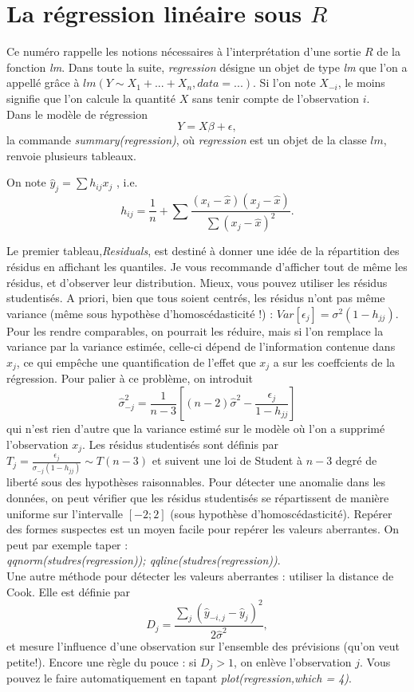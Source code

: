 \section{La régression linéaire sous $R$}

Ce numéro rappelle les notions nécessaires à l'interprétation d'une sortie $R$ de la fonction \textit{lm}. Dans toute la suite, \textit{regression} désigne un objet de type \textit{lm} que l'on a appellé grâce à $lm(Y\sim X_1+...+X_n, data=...)$. Si l'on note $X_{-i}$, le moins signifie que l'on calcule la quantité $X$ sans tenir compte de l'observation $i$.\\

Dans le modèle de régression \[Y=X\beta + \epsilon ,\]
la commande \textit{summary(regression)}, où \textit{regression} est un objet de la classe $lm$, renvoie plusieurs tableaux. 

On note $\hat y_j =  \sum h_{ij}x_j$ , i.e. \[h_{ij}= \frac{1}{n}+\sum \frac{(x_i-\hat x)(x_j-\hat x)}{\sum (x_j-\hat x)^2}.\]

Le premier tableau,\textit{Residuals}, est destiné à donner une idée de la répartition des résidus en affichant les quantiles.  Je vous recommande d'afficher tout de même les résidus, et d'observer leur distribution. Mieux, vous pouvez utiliser les résidus studentisés. A priori, bien que tous soient centrés, les résidus n'ont pas même variance (même sous hypothèse d'homoscédasticité !) : $Var[\epsilon_j]=\sigma^2(1-h_{jj})$. Pour les rendre comparables, on pourrait les réduire, mais si l'on remplace la variance par la variance estimée, celle-ci dépend de l'information contenue dans $x_j$, ce qui empêche une quantification de l'effet que $x_j$ a sur les coeffcients de la régression. Pour palier à ce problème, on introduit 
\[\hat \sigma_{-j}^2 = \frac{1}{n-3}[(n-2)\hat \sigma^2-\frac{\epsilon_j}{1-h_{jj}}]\]
qui n'est rien d'autre que la variance estimé sur le modèle où l'on a supprimé l'observation $x_j$. Les résidus studentisés sont définis par $T_j = \frac{\epsilon_j}{\sigma_{-j}(1-h_{jj})}\sim T(n-3)$ et suivent une loi de Student à $n-3$ degré de liberté sous des hypothèses raisonnables. Pour détecter une anomalie dans les données, on peut vérifier que les résidus studentisés se répartissent de manière uniforme sur l'intervalle $[-2;2]$ (sous hypothèse d'homoscédasticité). Repérer des formes suspectes est un moyen facile pour repérer les valeurs aberrantes. On peut par exemple taper : \\
\textit{qqnorm(studres(regression)); qqline(studres(regression))}.\\
Une autre méthode pour détecter les valeurs aberrantes : utiliser la distance de Cook. Elle est définie par 
\[D_j= \frac{\sum_j (\hat y_{-i,j}-\hat y_j)^2}{2\hat \sigma^2},\]
et mesure l'influence d'une observation sur l'ensemble des prévisions (qu'on veut petite!). Encore une règle du pouce : si $D_j>1$, on enlève l'observation $j$. Vous pouvez le faire automatiquement en tapant \textit{plot(regression,which = 4)}.

